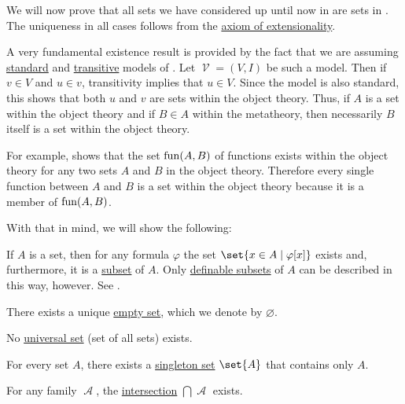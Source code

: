 \begin{proposition}\label{thm:zfc_existence_theorems}
  We will now prove that all sets we have considered up until now in  are sets in \hyperref[def:zfc]{}. The uniqueness in all cases follows from the \hyperref[def:zfc/extensionality]{axiom of extensionality}.

  A very fundamental existence result is provided by the fact that we are assuming \hyperref[rem:standard_model_of_set_theory]{standard} and \hyperref[rem:transitive_model_of_set_theory]{transitive} models of . Let \( \mscrV = (V, I) \) be such a model. Then if \( v \in V \) and \( u \in v \), transitivity implies that \( u \in V \). Since the model is also standard, this shows that both \( u \) and \( v \) are sets within the object theory. Thus, if \( A \) is a set within the object theory and if \( B \in A \) within the metatheory, then necessarily \( B \) itself is a set within the object theory.

  For example,  shows that the set \( \operatorname{fun}(A, B) \) of functions exists within the object theory for any two sets \( A \) and \( B \) in the object theory. Therefore every single function between \( A \) and \( B \) is a set within the object theory because it is a member of \( \operatorname{fun}(A, B) \).

  With that in mind, we will show the following:

  \begin{thmenum}
     If \( A \) is a set, then for any formula \( \varphi \) the set \( \set{ x \in A \given \varphi[x] } \) exists and, furthermore, it is a \hyperref[def:subset]{subset} of \( A \). Only \hyperref[def:first_order_definability]{definable subsets} of \( A \) can be described in this way, however. See .

     There exists a unique \hyperref[def:empty_set]{empty set}, which we denote by \( \varnothing \).

     No \hyperref[def:set]{universal set} (set of all sets) exists.

     For every set \( A \), there exists a \hyperref[rem:singleton_sets]{singleton set} \( \set{ A } \) that contains only \( A \).

     For any  family \( \mscrA \), the \hyperref[def:basic_set_operations/intersection]{intersection} \( \bigcap \mscrA \) exists.


\end{thmenum}
\end{proposition}
